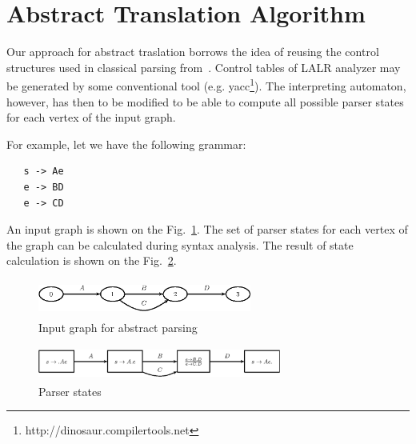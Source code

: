 \section{Abstract Translation Algorithm}
\label{sec:AbstractTranslation}

Our approach for abstract traslation borrows the idea of reusing the control structures used in 
classical parsing from~\cite{AbstrParsing}. Control tables of LALR analyzer may be generated by
some conventional tool (e.g. yacc\footnote{http://dinosaur.compilertools.net}). The interpreting 
automaton, however, has then to be modified to be able to compute all possible parser states 
for each vertex of the input graph. 


For example, let we have the following grammar:

\begin{verbatim}
   s -> Ae
   e -> BD
   e -> CD
\end{verbatim}

An input graph is shown on the Fig.~\ref{pic2}. The set of parser states for each vertex of 
the graph can be calculated during syntax analysis. The result of state calculation is shown on 
the Fig.~\ref{pic3}.

\begin{figure}[h]
    \begin{center}
        \includegraphics[width=7cm,height=1.2cm]{graphs/simple_grammar_inpt.eps}
        \caption{Input graph for abstract parsing}
        \label{pic2}
    \end{center}
\end{figure}

\begin{figure}[h]
    \begin{center}
        \includegraphics[width=8cm,height=1.1cm]{graphs/simple_grammar_items.eps}
        \caption{Parser states}
        \label{pic3}
    \end{center}
\end{figure}


